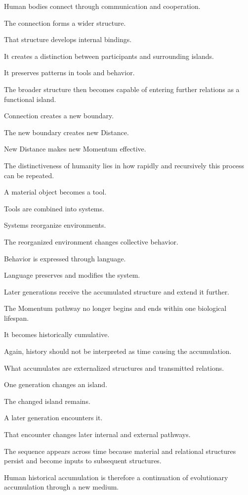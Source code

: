 Human bodies connect through communication and cooperation.

The connection forms a wider structure.

That structure develops internal bindings.

It creates a distinction between participants and surrounding islands.

It preserves patterns in tools and behavior.

The broader structure then becomes capable of entering further relations as a functional island.

Connection creates a new boundary.

The new boundary creates new Distance.

New Distance makes new Momentum effective.

The distinctiveness of humanity lies in how rapidly and recursively this process can be repeated.

A material object becomes a tool.

Tools are combined into systems.

Systems reorganize environments.

The reorganized environment changes collective behavior.

Behavior is expressed through language.

Language preserves and modifies the system.

Later generations receive the accumulated structure and extend it further.

The Momentum pathway no longer begins and ends within one biological lifespan.

It becomes historically cumulative.

Again, history should not be interpreted as time causing the accumulation.

What accumulates are externalized structures and transmitted relations.

One generation changes an island.

The changed island remains.

A later generation encounters it.

That encounter changes later internal and external pathways.

The sequence appears across time because material and relational structures persist and become inputs to subsequent structures.

Human historical accumulation is therefore a continuation of evolutionary accumulation through a new medium.

